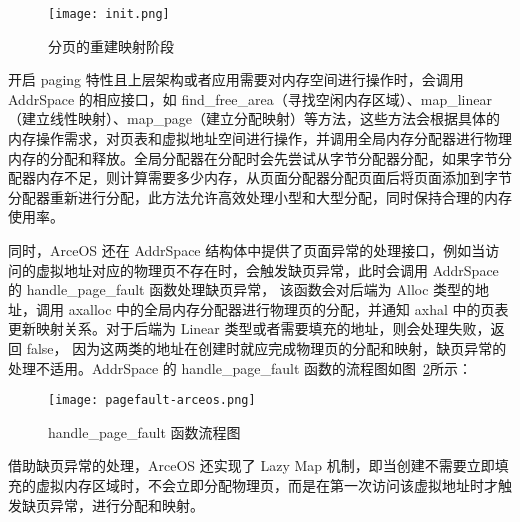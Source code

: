 \begin{figure}[H]
    \centering
    \texttt{[image: init.png]}
    \caption{分页的重建映射阶段}
    \label{fig:init}
\end{figure}

开启 paging 特性且上层架构或者应用需要对内存空间进行操作时，会调用 AddrSpace 的相应接口，如 find\_free\_area（寻找空闲内存区域）、map\_linear（建立线性映射）、map\_page（建立分配映射）等方法，这些方法会根据具体的内存操作需求，对页表和虚拟地址空间进行操作，并调用全局内存分配器进行物理内存的分配和释放。全局分配器在分配时会先尝试从字节分配器分配，如果字节分配器内存不足，则计算需要多少内存，从页面分配器分配页面后将页面添加到字节分配器重新进行分配，此方法允许高效处理小型和大型分配，同时保持合理的内存使用率。

同时，ArceOS 还在 AddrSpace 结构体中提供了页面异常的处理接口，例如当访问的虚拟地址对应的物理页不存在时，会触发缺页异常，此时会调用 AddrSpace 的 handle\_page\_fault 函数处理缺页异常，
该函数会对后端为 Alloc 类型的地址，调用 axalloc 中的全局内存分配器进行物理页的分配，并通知 axhal 中的页表更新映射关系。对于后端为 Linear 类型或者需要填充的地址，则会处理失败，返回 false，
因为这两类的地址在创建时就应完成物理页的分配和映射，缺页异常的处理不适用。AddrSpace 的 handle\_page\_fault 函数的流程图如图~\ref{fig:handle-page-fault-arceos}所示：

\begin{figure}[H]
    \centering
    \texttt{[image: pagefault-arceos.png]}
    \caption{handle\_page\_fault 函数流程图}
    \label{fig:handle-page-fault-arceos}
\end{figure}


借助缺页异常的处理，ArceOS 还实现了 Lazy Map 机制，即当创建不需要立即填充的虚拟内存区域时，不会立即分配物理页，而是在第一次访问该虚拟地址时才触发缺页异常，进行分配和映射。